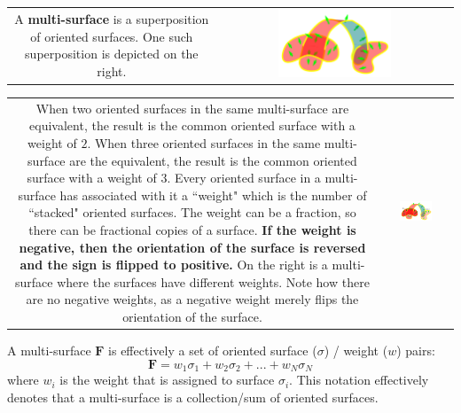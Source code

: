 \begin{tabular}{cc}
\parbox{0.5\textwidth}{
A \textbf{multi-surface} is a superposition of oriented surfaces. One such superposition is depicted on the right.
} & \parbox{0.5\textwidth}{
\includegraphics[width = 0.5\textwidth]{Multi-structures/Multisurfaces/multi-surface_simple}
}
\end{tabular}

\begin{tabular}{cc}
\parbox{0.5\textwidth}{
When two oriented surfaces in the same multi-surface are equivalent, the result is the common oriented surface with a weight of \(2\). When three oriented surfaces in the same multi-surface are the equivalent, the result is the common oriented surface with a weight of \(3\). Every oriented surface in a multi-surface has associated with it a ``weight" which is the number of ``stacked" oriented surfaces. The weight can be a fraction, so there can be fractional copies of a surface. {\bf If the weight is negative, then the orientation of the surface is reversed and the sign is flipped to positive.} On the right is a multi-surface where the surfaces have different weights. Note how there are no negative weights, as a negative weight merely flips the orientation of the surface.  
} & \parbox{0.5\textwidth}{
\includegraphics[width = 0.5\textwidth]{Multi-structures/Multisurfaces/multi-surface_multiplicity}
}
\end{tabular}

\vspace{2mm}

A multi-surface \(\mathbf{F}\) is effectively a set of oriented surface (\(\sigma\)) / weight (\(w\)) pairs:
\[\mathbf{F} = w_1 \sigma_1 + w_2 \sigma_2 + ... + w_N \sigma_N\]
where \(w_i\) is the weight that is assigned to surface \(\sigma_i\). This notation effectively denotes that a multi-surface is a collection/sum of oriented surfaces.

